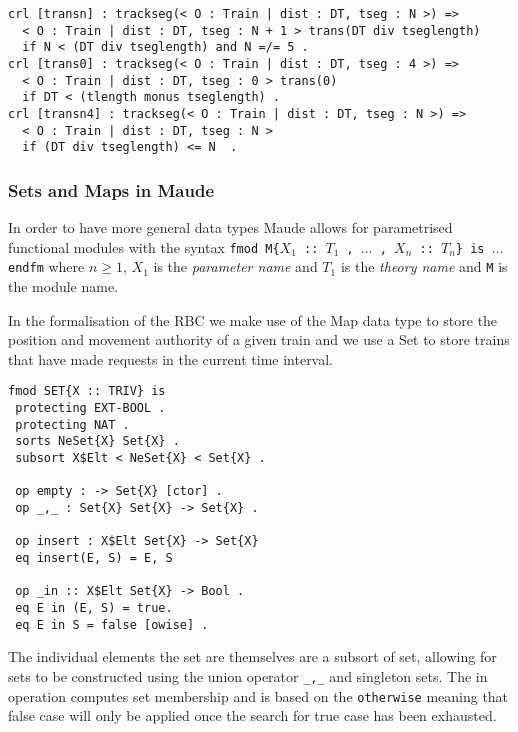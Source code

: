 \begin{lstlisting}[caption = "Rewriting rules for the trackseg operation"]
crl [transn] : trackseg(< O : Train | dist : DT, tseg : N >) => 
  < O : Train | dist : DT, tseg : N + 1 > trans(DT div tseglength) 
  if N < (DT div tseglength) and N =/= 5 .
crl [trans0] : trackseg(< O : Train | dist : DT, tseg : 4 >) => 
  < O : Train | dist : DT, tseg : 0 > trans(0) 
  if DT < (tlength monus tseglength) .
crl [transn4] : trackseg(< O : Train | dist : DT, tseg : N >) => 
  < O : Train | dist : DT, tseg : N >  
  if (DT div tseglength) <= N  .
\end{lstlisting}

\subsubsection*{Sets and Maps in Maude}
In order to have more general data types Maude allows for parametrised functional modules with the  syntax \texttt{fmod M\{$X_1$ :: $T_1$ , $\ldots$ , $X_n$ :: $T_n$\} is $\ldots$ endfm} where $n \geq 1$, $X_1$ is the \emph{parameter name} and $T_1$ is the \emph{theory name} and \texttt{M} is the module name.

In the formalisation of the RBC we make use of the Map data type to store the position and movement authority of a given train and we use a Set to store trains that have made requests in the current time interval. 

\begin{lstlisting}[caption = The specification of the Set data type in Maude]
fmod SET{X :: TRIV} is 
 protecting EXT-BOOL .
 protecting NAT .
 sorts NeSet{X} Set{X} .
 subsort X$Elt < NeSet{X} < Set{X} .

 op empty : -> Set{X} [ctor] .
 op _,_ : Set{X} Set{X} -> Set{X} .
 
 op insert : X$Elt Set{X} -> Set{X}
 eq insert(E, S) = E, S

 op _in :: X$Elt Set{X} -> Bool .
 eq E in (E, S) = true.
 eq E in S = false [owise] .

\end{lstlisting}

The individual elements the set are themselves are a subsort of set, allowing for sets to be constructed using the union operator \texttt{\_,\_} and singleton sets. The in operation computes set membership and is based on the \texttt{otherwise}  meaning that false case will only be applied once the search for true case has been exhausted.

